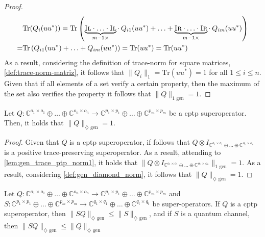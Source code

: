 \begin{proof}
\begin{equation}
\begin{split}
  &\text{Tr} (Q_i(u u^{*})) =  \text{Tr} \left( \underbrace{\textsc{Il} \cdot \ldots \cdot \textsc{Il}}_{m-1 \times } \cdot \hspace{2pt} Q_{i1} (u u^{*}) + \ldots + \underbrace{\textsc{Ir} \cdot \ldots \cdot \textsc{Ir}}_{m-1 \times } \cdot  \hspace{2pt} Q_{im}(u u^{*}) \right) \\
  =&   \text{Tr} \left( Q_{i1} (u u^{*}) + \ldots + Q_{im}(u u^{*}) \right) = \text{Tr} (u u^{*}) = \text{Tr} (u u^{*})
\end{split}
\end{equation}
As a result, considering the definition of trace-norm for square matrices, \autoref{def:trace-norm-matriz},  it follows that $\lVert Q_i \rVert_{1} = \text{Tr} (u u^{*}) = 1$ for all $1 \leq i \leq n$. Given that if all elements of a set verify a certain property, then the maximum of the set also verifies the property it follows that $\lVert Q \rVert_{1 \text{ gen}} = 1$.

\end{proof}

\begin{lemma} \label{lem:gen_diamond_cptp_norm}
  Let  $Q: \mathbb{C}^{o_1 \times o_1} \oplus \ldots \oplus \mathbb{C}^{o_n \times o_n}  \rightarrow \mathbb{C}^{p_1 \times p_1} \oplus \ldots \oplus  \mathbb{C}^{p_m \times p_m}$ be a \acrshort{cptp} superoperator. Then, it holds that $\lVert Q \rVert_{\diamondsuit \text{ gen}} = 1$.
\end{lemma}

\begin{proof}
  Given that $Q$ is a \acrshort{cptp} superoperator, if follows that $ Q \otimes I_{\mathbb{C}^{o_1 \times o_1} \oplus \ldots \oplus \mathbb{C}^{o_n \times o_n}}$ is a positive trace-preserving superoperator. As a result, attending to \autoref{lem:gen_trace_ptp_norm1}, it holds that $\lVert Q \otimes I_{\mathbb{C}^{o_1 \times o_1} \oplus \ldots \oplus \mathbb{C}^{o_n \times o_n}} \rVert_{1 \text{ gen}} = 1$. As a result, considering  \autoref{def:gen_diamond_norm}, it follows that $\lVert Q \rVert_{\diamondsuit \text{ gen}} = 1$.
\end{proof}

\begin{theorem}
  Let  $Q: \mathbb{C}^{o_1 \times o_1} \oplus \ldots \oplus \mathbb{C}^{o_n \times o_n}  \rightarrow \mathbb{C}^{p_1 \times p_1} \oplus \ldots \oplus  \mathbb{C}^{p_m \times p_m}$ and $S: \mathbb{C}^{p_1 \times p_1} \oplus \ldots \oplus \mathbb{C}^{p_m \times p_m}  \rightarrow \mathbb{C}^{q_1 \times q_1} \oplus \ldots \oplus \mathbb{C}^{q_t \times q_t}$ be super-operators. If $Q$ is a \acrshort{cptp} superoperator, then $\lVert S  Q \rVert_{\diamondsuit \text{ gen}} \leq \lVert S \rVert_{\diamondsuit \text{ gen}}$, and if $S$ is a quantum channel, then $\lVert S  Q \rVert_{\diamondsuit \text{ gen}} \leq \lVert Q \rVert_{\diamondsuit \text{ gen}}$
\end{theorem}

